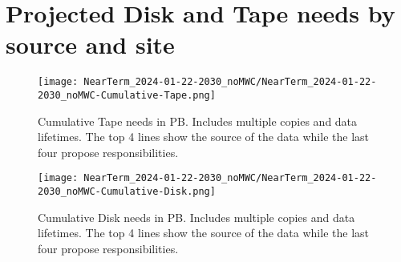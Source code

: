 \section{Projected Disk and Tape needs by source and site}
\begin{figure}[h]
\centering\texttt{[image: NearTerm\_2024-01-22-2030\_noMWC/NearTerm\_2024-01-22-2030\_noMWC-Cumulative-Tape.png]}
\caption{Cumulative Tape needs in PB. Includes multiple copies and data lifetimes. The top 4 lines show the source of the data while the last four propose responsibilities.}
\label{fig:Cumulative-Tape}
\end{figure}
\begin{figure}[h]
\centering\texttt{[image: NearTerm\_2024-01-22-2030\_noMWC/NearTerm\_2024-01-22-2030\_noMWC-Cumulative-Disk.png]}
\caption{Cumulative Disk needs in PB. Includes multiple copies and data lifetimes. The top 4 lines show the source of the data while the last four propose responsibilities.}
\label{fig:Cumulative-Disk}
\end{figure}

